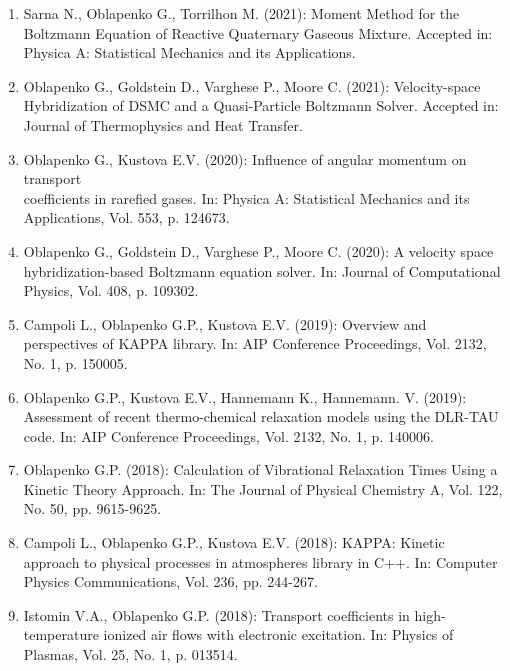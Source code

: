 \documentclass{resume} %
\begin{document}
\begin{enumerate}


\item Sarna N., Oblapenko G., Torrilhon M. (2021): Moment Method for the Boltzmann Equation of Reactive Quaternary Gaseous Mixture. Accepted in: Physica A: Statistical Mechanics and its Applications.

\item {Oblapenko G.}, Goldstein D., Varghese P., Moore C. (2021): Velocity-space Hybridization of DSMC and a Quasi-Particle Boltzmann Solver. Accepted in: Journal of Thermophysics and Heat Transfer.

\item {Oblapenko G.}, Kustova E.V. (2020): Influence of angular momentum on transport\\ coefficients in rarefied gases. In: Physica A: Statistical Mechanics and its Applications, Vol. 553, p. 124673.

\item {Oblapenko G.}, Goldstein D., Varghese P., Moore C. (2020): A velocity space hybridization-based Boltzmann equation solver. In: Journal of Computational Physics, Vol. 408, p. 109302.

\item {Campoli L., {Oblapenko G.P.}, Kustova E.V.} (2019): Overview and perspectives of KAPPA library. In: AIP Conference Proceedings, Vol. 2132, No. 1, p. 150005.

\item {{Oblapenko G.P.}, Kustova E.V., Hannemann K., Hannemann. V.} (2019): Assessment of recent thermo-chemical relaxation models using the DLR-TAU code. In: AIP Conference Proceedings, Vol. 2132, No. 1, p. 140006.

\item {{Oblapenko G.P.}} (2018): Calculation of Vibrational Relaxation Times Using a Kinetic Theory Approach. In: The Journal of Physical Chemistry A, Vol. 122, No. 50, pp. 9615-9625.

\item {Campoli L., {Oblapenko G.P.}, Kustova E.V.} (2018): KAPPA: Kinetic approach to physical processes in atmospheres library in C++. In: Computer Physics Communications, Vol. 236, pp. 244-267.

\item {Istomin V.A., {Oblapenko G.P.}} (2018): Transport coefficients in high-temperature ionized air flows with electronic excitation. In: Physics of Plasmas, Vol. 25, No. 1, p. 013514.


\end{enumerate}
\end{document}
